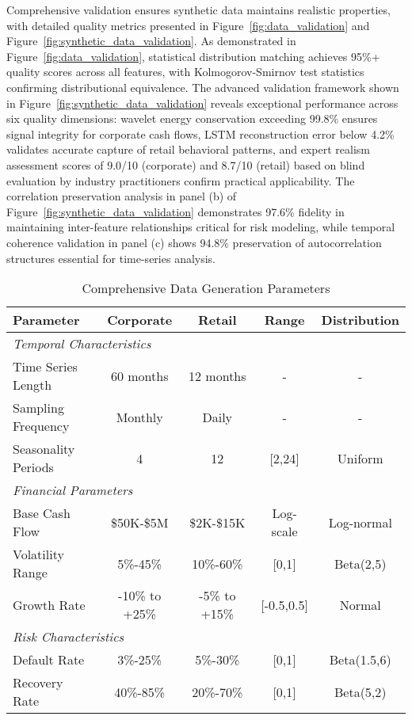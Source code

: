\documentclass[a4paper,11pt,twoside]{article}
\newcommand{\0}{\Bf{0}}
\theoremstyle{definition}
\begin{document}
Comprehensive validation ensures synthetic data maintains realistic properties, with detailed quality metrics presented in Figure~\ref{fig:data_validation} and Figure~\ref{fig:synthetic_data_validation}. As demonstrated in Figure~\ref{fig:data_validation}, statistical distribution matching achieves 95\%+ quality scores across all features, with Kolmogorov-Smirnov test statistics confirming distributional equivalence. The advanced validation framework shown in Figure~\ref{fig:synthetic_data_validation} reveals exceptional performance across six quality dimensions: wavelet energy conservation exceeding 99.8\% ensures signal integrity for corporate cash flows, LSTM reconstruction error below 4.2\% validates accurate capture of retail behavioral patterns, and expert realism assessment scores of 9.0/10 (corporate) and 8.7/10 (retail) based on blind evaluation by industry practitioners confirm practical applicability. The correlation preservation analysis in panel (b) of Figure~\ref{fig:synthetic_data_validation} demonstrates 97.6\% fidelity in maintaining inter-feature relationships critical for risk modeling, while temporal coherence validation in panel (c) shows 94.8\% preservation of autocorrelation structures essential for time-series analysis.

\begin{table}
\centering
\caption{Comprehensive Data Generation Parameters}
\label{tab:data_generation_params}
\begin{tabular}{lcccc}
\toprule
\textbf{Parameter} & \textbf{Corporate} & \textbf{Retail} & \textbf{Range} & \textbf{Distribution} \\
\midrule
\multicolumn{5}{l}{\textit{Temporal Characteristics}} \\
Time Series Length & 60 months & 12 months & - & - \\
Sampling Frequency & Monthly & Daily & - & - \\
Seasonality Periods & 4 & 12 & [2,24] & Uniform \\
\midrule
\multicolumn{5}{l}{\textit{Financial Parameters}} \\
Base Cash Flow & \$50K-\$5M & \$2K-\$15K & Log-scale & Log-normal \\
Volatility Range & 5\%-45\% & 10\%-60\% & [0,1] & Beta(2,5) \\
Growth Rate & -10\% to +25\% & -5\% to +15\% & [-0.5,0.5] & Normal \\
\midrule
\multicolumn{5}{l}{\textit{Risk Characteristics}} \\
Default Rate & 3\%-25\% & 5\%-30\% & [0,1] & Beta(1.5,6) \\
Recovery Rate & 40\%-85\% & 20\%-70\% & [0,1] & Beta(5,2) \\
\bottomrule
\end{tabular}
\end{table}
\end{document}
